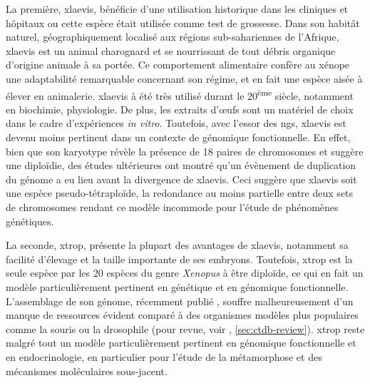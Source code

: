 La première, \gls{xlaevis}, bénéficie d'une utilisation historique dans les cliniques et hôpitaux ou cette espèce était utilisée comme test de grossesse.
Dans son habitât naturel, géographiquement localisé aux régions sub-sahariennes de l'Afrique, \gls{xlaevis} est un animal charognard et se nourrissant de tout débris organique d'origine animale à sa portée.
Ce comportement alimentaire confère au xénope une adaptabilité remarquable concernant son régime, et en fait une espèce aisée à élever en animalerie.
\gls{xlaevis} à été très utilisé durant le 20\textsuperscript{ème} siècle, notamment en biochimie, physiologie.
De plus, les extraits d'œufs sont un matériel de choix dans le cadre d'expériences \textit{in vitro}.
Toutefois, avec l'essor des \gls{ngs}, \gls{xlaevis} est devenu moins pertinent dans un contexte de génomique fonctionnelle.
En effet, bien que son karyotype révèle la présence de 18 paires de chromosomes et suggère une diploïdie, des études ultérieures ont montré qu'un évènement de duplication du génome a eu lieu avant la divergence de \gls{xlaevis}.
Ceci suggère que \gls{xlaevis} soit une espèce pseudo-tétraploïde, la redondance au moins partielle entre deux sets de chromosomes rendant ce modèle incommode pour l'étude de phénomènes génétiques.

La seconde, \gls{xtrop}, présente la plupart des avantages de \gls{xlaevis}, notamment sa facilité d'élevage et la taille importante de ses embryons.
Toutefois, \gls{xtrop} est la seule espèce par les 20 espèces du genre \textit{Xenopus} à être diploïde, ce qui en fait un modèle particulièrement pertinent en génétique et en génomique fonctionnelle.
L'assemblage de son génome, récemment publié \citep{Hellsten2010a}, souffre malheureusement d'un manque de ressources évident comparé à des organismes modèles plus populaires comme la souris ou la drosophile (pour revue, voir \citet{Grimaldi2013}, \autoref{sec:ctdb-review}).
\gls{xtrop} reste malgré tout un modèle particulièrement pertinent en génomique fonctionnelle et en endocrinologie, en particulier pour l'étude de la métamorphose et des mécanismes moléculaires sous-jacent.





